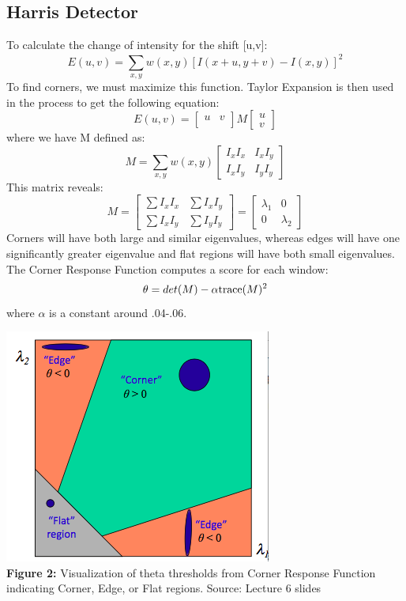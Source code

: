 \documentclass{article}
\begin{document}
\subsection{Harris Detector}
To calculate the change of intensity for the shift [u,v]:
$$E(u,v) = \sum_{x,y}^{} w(x,y)[I(x+u,y+v)-I(x,y)]^2$$
To find corners, we must maximize this function. Taylor Expansion is then used in the process to get the following equation:
\[
E(u,v)=
  \begin{bmatrix}
    u & v\\
  \end{bmatrix}
  M
  \begin{bmatrix}
      u \\
      v
    \end{bmatrix}
\]
where we have M defined as:
\[M =
\sum_{x,y}^{} w(x,y)
  \begin{bmatrix}
      I_x I_x & I_x I_y\\
      I_x I_y & I_y I_y
    \end{bmatrix}
\]
This matrix reveals:
\[M =
  \begin{bmatrix}
      \sum I_x I_x & \sum I_x I_y\\
      \sum I_x I_y & \sum I_y I_y
    \end{bmatrix}
    =
    \begin{bmatrix}
      \lambda_1 & 0\\
      0 & \lambda_2
    \end{bmatrix}
\]
Corners will have both large and similar eigenvalues, whereas edges will have one significantly greater eigenvalue and flat regions will have both small eigenvalues.
The Corner Response Function computes a score for each window:
$$\theta = det(M) - \alpha \textnormal{trace} (M)^2 $$
where $\alpha$ is a constant around .04-.06. 
\begin{center}
	\includegraphics[scale=0.5]{eigenvalues_harris.png}\\
    \textbf{Figure 2:} Visualization of theta thresholds from Corner Response Function indicating Corner, Edge, or Flat regions. Source: Lecture 6 slides\\
\end{center}
\end{document}
